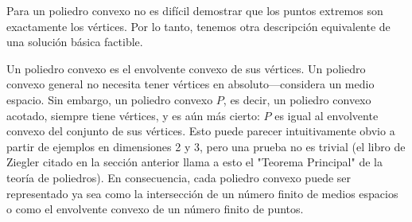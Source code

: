 \documentclass{article}
\begin{document}
Para un poliedro convexo no es difícil demostrar que los puntos extremos son exactamente los vértices. Por lo tanto, tenemos otra descripción equivalente de una solución básica factible.

Un poliedro convexo es el envolvente convexo de sus vértices. Un poliedro convexo general no necesita tener vértices en absoluto—considera un medio espacio. Sin embargo, un poliedro convexo \( P \), es decir, un poliedro convexo acotado, siempre tiene vértices, y es aún más cierto: \( P \) es igual al envolvente convexo del conjunto de sus vértices. Esto puede parecer intuitivamente obvio a partir de ejemplos en dimensiones 2 y 3, pero una prueba no es trivial (el libro de Ziegler citado en la sección anterior llama a esto el "Teorema Principal" de la teoría de poliedros). En consecuencia, cada poliedro convexo puede ser representado ya sea como la intersección de un número finito de medios espacios o como el envolvente convexo de un número finito de puntos.
\end{document}
